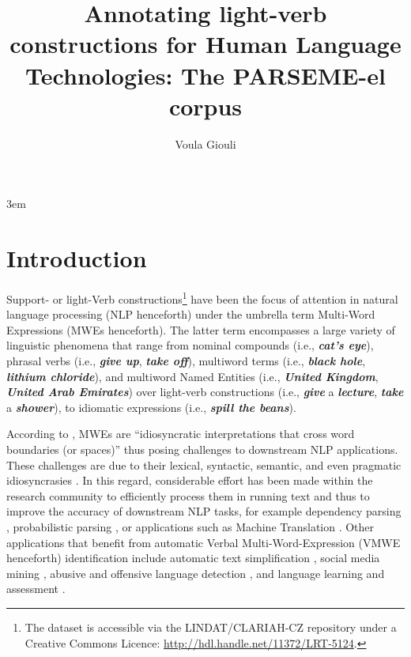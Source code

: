 \documentclass[output=paper,colorlinks,citecolor=brown]{langscibook}
\author{Voula Giouli\affiliation{Aristotle University of Thessaloniki and Institute for Language and Speech Processing, ATHENA RC, Greece}}
\title[Annotating light-verb constructions for Human Language Technologies]{Annotating light-verb constructions for Human Language Technologies: The PARSEME-el corpus}
\begin{document}
\emergencystretch 3em

\maketitle


\section{Introduction}
Support- or light-Verb constructions\footnote{The dataset is accessible via the LINDAT/CLARIAH-CZ repository under a Creative Commons Licence: \url{http://hdl.handle.net/11372/LRT-5124}.} have been the focus of attention in natural language processing (NLP henceforth) under the umbrella term Multi-Word Expressions (MWEs henceforth). The latter term encompasses a large variety of linguistic phenomena that range from nominal compounds (i.e., \textbf{\em{cat's eye}}), phrasal verbs (i.e., \textbf{\em{give up}}, \textbf{\em{take off}}),  multiword terms (i.e., \textbf{\em{black hole}}, \textbf{\em{lithium chloride}}), and multiword Named Entities (i.e., \textbf{\em{United Kingdom}}, \textbf{\em{United Arab Emirates}}) over light-verb constructions (i.e., \textbf{\em{give}}  a \textbf{\em{lecture}}, \textbf{\em{take}} a \textbf{\em{shower}}), to idiomatic expressions (i.e., \textbf{\em{spill the beans}}). 

According to \citet[190]{sag_etal_2002}, MWEs are “idiosyncratic interpretations that cross word boundaries (or spaces)” thus posing challenges to downstream NLP applications. These challenges are due to their lexical, syntactic, semantic, and even pragmatic idiosyncrasies \citep{gross_1982, baldwin_kim_2010}. In this regard, considerable effort has been made within the research community to efficiently process them in running text and thus to improve the accuracy of downstream NLP tasks, for example dependency parsing \citep{Nivre-Nilsson}, probabilistic parsing \citep{Arun-Keller, Korkotzelos-Manandhar, Constant-et-al}, or applications such as Machine Translation \citep{Ren-et-al, Carpuat-Diab, Bouamor-et-al, Zaninello-Birch}. Other applications that benefit from automatic Verbal Multi-Word-Expression (VMWE henceforth) identification include automatic text simplification \citep{Kochmar2020, gooding-etal-2020-incorporating, shardlow-etal-2021-semeval}, social media mining \citep{maistoetal-2017}, abusive and offensive language detection \citep{caselli-etal-2020-feel}, and language learning and assessment \citep{paquot2019}. 
\end{document}
